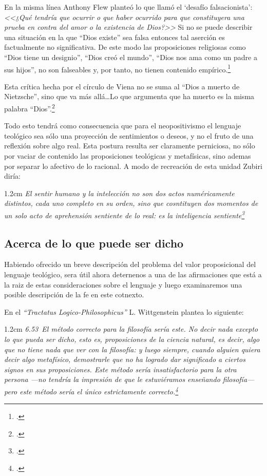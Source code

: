 \documentclass[10pt]{article}
\newcommand{\citalitlar}[1]{
\begin{adjustwidth}{1.2cm}{}
\emph{#1}
\end{adjustwidth}
}
\begin{document}
En la misma línea Anthony Flew planteó lo que llamó el `desafío falsacionista':
\emph{<<¿Qué tendría que ocurrir o que haber ocurrido para que constituyera una
  prueba en contra del amor o la existencia de Dios?>>} Si no se puede describir
una situación en la que ``Dios existe'' sea falsa entonces tal aserción es
factualmente no significativa. De este modo las proposiciones religiosas como
``Dios tiene un designio'', ``Dios creó el mundo'', ``Dios nos ama como un padre
a sus hijos'', no son falseables y, por tanto, no tienen contenido
empírico.\footcite{cyc}

Esta crítica hecha por el círculo de Viena no se suma al ``Dios a muerto de
Nietzsche'', sino que va más allá\ldots Lo que argumenta que ha muerto es la
misma palabra ``Dios''.\footcite{anteo}

Todo esto tendrá como consecuencia que para el neopositivismo el lenguaje
teológico sea sólo una proyección de sentimientos o deseos, y no el fruto de una
reflexión sobre algo real. Esta postura resulta ser claramente perniciosa, no
sólo por vaciar de contenido las proposiciones teológicas y metafísicas, sino
ademas por separar lo afectivo de lo racional. A modo de recreación de esta
unidad Zubiri diría:
\citalitlar{El sentir humano y la intelección no son dos actos numéricamente
  distintos, cada uno completo en su orden, sino que cosntituyen dos momentos
  de un solo acto de aprehensión sentiente de lo real: es la inteligencia
  sentiente\footcite{zubiri}}

\subsection{Acerca de lo que puede ser dicho}
Habiendo ofrecido un breve descripción del problema del valor proposicional del
lenguaje teológico, sera útil ahora deternenos a una de las afirmaciones que
está a la raiz de estas consideraciones sobre el lenguaje y luego examinaremos
una posible descripción de la fe en este cotnexto.

En el \emph{``Tractatus Logico-Philosophicus''} L. Wittgenstein plantea lo siguiente:
\citalitlar{6.53~El método correcto para la filosofía sería este. No decir nada
  excepto lo que pueda ser dicho, esto es, proposiciones de la ciencia natural,
  es decir, algo que no tiene nada que ver con la filosofía: y luego siempre,
  cuando alguien quiera decir algo metafísico, demostrarle que no ha logrado dar
  significado a ciertos signos en sus proposiciones. Este método sería
  insatisfactorio para la otra persona ---no tendría la impresión de que le
  estuviéramos enseñando filosofía--- pero este método sería el único
  estrictamente correcto.\footcite{tractatus}}
\end{document}
